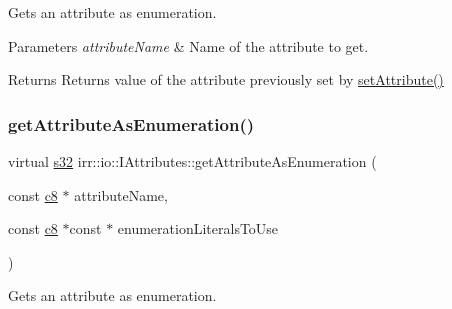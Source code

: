 Gets an attribute as enumeration. 


\begin{DoxyParams}{Parameters}
{\em attribute\+Name} & Name of the attribute to get. \\
\hline
\end{DoxyParams}
\begin{DoxyReturn}{Returns}
Returns value of the attribute previously set by \hyperlink{classirr_1_1io_1_1IAttributes_a03fa31acb481ae23678676cc183f09a6}{set\+Attribute()} 
\end{DoxyReturn}
\mbox{\label{classirr_1_1io_1_1IAttributes_a77c6a5fba661a85701986382df7d13b3}} 
\subsubsection{\texorpdfstring{get\+Attribute\+As\+Enumeration()}{getAttributeAsEnumeration()}\hspace{0.1cm}{\footnotesize\ttfamily [2/4]}}
{\footnotesize\ttfamily virtual \hyperlink{namespaceirr_ac66849b7a6ed16e30ebede579f9b47c6}{s32} irr\+::io\+::\+I\+Attributes\+::get\+Attribute\+As\+Enumeration (\begin{DoxyParamCaption}\item[{const \hyperlink{namespaceirr_a9395eaea339bcb546b319e9c96bf7410}{c8} $\ast$}]{attribute\+Name,  }\item[{const \hyperlink{namespaceirr_a9395eaea339bcb546b319e9c96bf7410}{c8} $\ast$const $\ast$}]{enumeration\+Literals\+To\+Use }\end{DoxyParamCaption})\hspace{0.3cm}{\ttfamily [pure virtual]}}



Gets an attribute as enumeration. 


